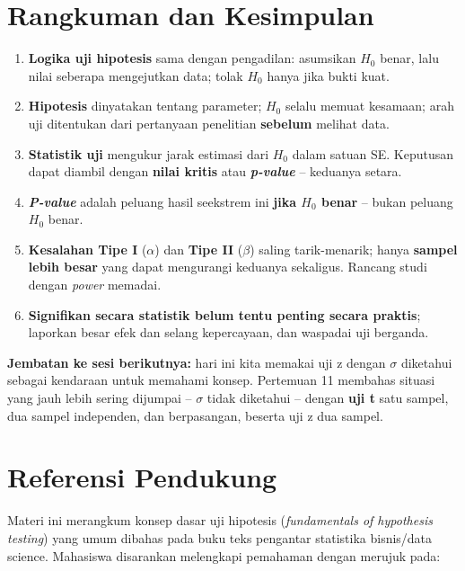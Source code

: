\documentclass[
  indonesian,
  letterpaper,
]{book}
\providecommand{\tightlist}{%
  \setlength{\itemsep}{0pt}\setlength{\parskip}{0pt}}
\begin{document}
\section{Rangkuman dan Kesimpulan}\label{rangkuman-dan-kesimpulan-1}

\begin{enumerate}
\def\labelenumi{\arabic{enumi}.}
\tightlist
\item
  \textbf{Logika uji hipotesis} sama dengan pengadilan: asumsikan
  \(H_0\) benar, lalu nilai seberapa mengejutkan data; tolak \(H_0\)
  hanya jika bukti kuat.
\item
  \textbf{Hipotesis} dinyatakan tentang parameter; \(H_0\) selalu memuat
  kesamaan; arah uji ditentukan dari pertanyaan penelitian
  \textbf{sebelum} melihat data.
\item
  \textbf{Statistik uji} mengukur jarak estimasi dari \(H_0\) dalam
  satuan SE. Keputusan dapat diambil dengan \textbf{nilai kritis} atau
  \textbf{\emph{p-value}} -- keduanya setara.
\item
  \textbf{\emph{P-value}} adalah peluang hasil seekstrem ini
  \textbf{jika \(H_0\) benar} -- bukan peluang \(H_0\) benar.
\item
  \textbf{Kesalahan Tipe I} (\(\alpha\)) dan \textbf{Tipe II}
  (\(\beta\)) saling tarik-menarik; hanya \textbf{sampel lebih besar}
  yang dapat mengurangi keduanya sekaligus. Rancang studi dengan
  \emph{power} memadai.
\item
  \textbf{Signifikan secara statistik belum tentu penting secara
  praktis}; laporkan besar efek dan selang kepercayaan, dan waspadai uji
  berganda.
\end{enumerate}

\textbf{Jembatan ke sesi berikutnya:} hari ini kita memakai uji z dengan
\(\sigma\) diketahui sebagai kendaraan untuk memahami konsep. Pertemuan
11 membahas situasi yang jauh lebih sering dijumpai -- \(\sigma\) tidak
diketahui -- dengan \textbf{uji t} satu sampel, dua sampel independen,
dan berpasangan, beserta uji z dua sampel.

\section{Referensi Pendukung}\label{referensi-pendukung-1}

Materi ini merangkum konsep dasar uji hipotesis (\emph{fundamentals of
hypothesis testing}) yang umum dibahas pada buku teks pengantar
statistika bisnis/data science. Mahasiswa disarankan melengkapi
pemahaman dengan merujuk pada:
\end{document}

